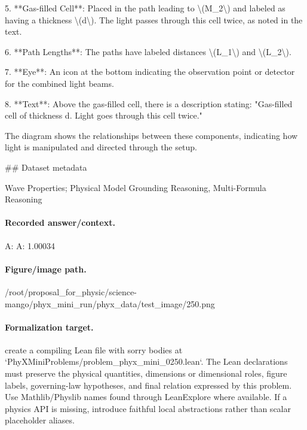 5. **Gas-filled Cell**: Placed in the path leading to \textbackslash{}(M\_2\textbackslash{}) and labeled as having a thickness \textbackslash{}(d\textbackslash{}). The light passes through this cell twice, as noted in the text.

6. **Path Lengths**: The paths have labeled distances \textbackslash{}(L\_1\textbackslash{}) and \textbackslash{}(L\_2\textbackslash{}).

7. **Eye**: An icon at the bottom indicating the observation point or detector for the combined light beams.

8. **Text**: Above the gas-filled cell, there is a description stating: "Gas-filled cell of thickness d. Light goes through this cell twice."

The diagram shows the relationships between these components, indicating how light is manipulated and directed through the setup.

\#\# Dataset metadata

Wave Properties; Physical Model Grounding Reasoning, Multi-Formula Reasoning

\paragraph{Recorded answer/context.}
A: A: 1.00034

\paragraph{Figure/image path.}
/root/proposal\_for\_physic/science-mango/phyx\_mini\_run/phyx\_data/test\_image/250.png

\paragraph{Formalization target.}
create a compiling Lean file with sorry bodies at `PhyXMiniProblems/problem\_phyx\_mini\_0250.lean`. The Lean declarations must preserve the physical quantities, dimensions or dimensional roles, figure labels, governing-law hypotheses, and final relation expressed by this problem.
Use Mathlib/Physlib names found through LeanExplore where available. If a physics API is missing, introduce faithful local abstractions rather than scalar placeholder aliases.

